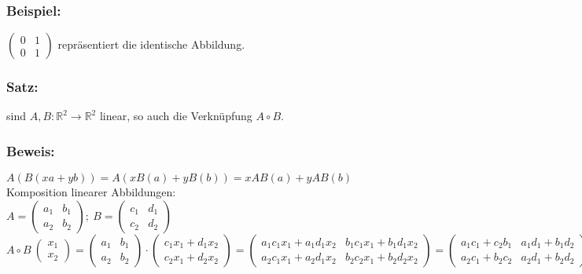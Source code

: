 \subsubsection{Beispiel: }
$\begin{pmatrix} 0 & 1 \\ 0 & 1 \end{pmatrix}$ repräsentiert die identische Abbildung.
%
%
%
\subsubsection{Satz: }
sind $A,B: \mathbb{R}^{2}\rightarrow \mathbb{R}^{2}$ linear, so auch die Verknüpfung $A \circ B$.
%
%
%
\subsubsection{Beweis:}
$A(B(xa+yb))=A(xB(a)+yB(b))=xAB(a)+yAB(b)$\\
Komposition linearer Abbildungen:\\
$A=\begin{pmatrix} a_{1} & b_{1} \\ a_{2} & b_{2} \end{pmatrix}; \ B=\begin{pmatrix} c_{1} & d_{1} \\ c_{2} & d_{2} \end{pmatrix}$ \\
$A \circ B \ \begin{pmatrix}x_{1} \\ x_{2} \end{pmatrix} = \begin{pmatrix}a_{1} & b_{1} \\ a_{2} & b_{2} \end{pmatrix} \cdot \begin{pmatrix} c_{1}x_{1} + d_{1} x_{2} \\ c_{2}x_{1} + d_{2}x_{2} \end{pmatrix} = \begin{pmatrix} a_{1}c_{1}x_{1} + a_{1}d_{1}x_{2} & b_{1}c_{1}x_{1} + b_{1}d_{1}x_{2} \\ a_{2}c_{1}x_{1} + a_{2}d_{1}x_{2} & b_{2}c_{2}x_{1} + b_{2} d_{2}x_{2} \end{pmatrix} = \begin{pmatrix} a_{1} c_{1} + c_{2} b_{1} & a_{1} d_{1} + b_{1} d_{2} \\ a_{2} c_{1} + b_{2} c_{2} & a_{2}d_{1} + b_{2}d_{2} \end{pmatrix} \ \begin{pmatrix} x_{1} \\ x_{2} \end{pmatrix}$\\
